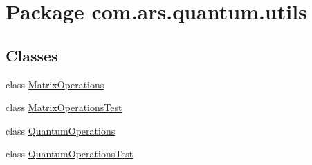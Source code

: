 \hypertarget{namespacecom_1_1ars_1_1quantum_1_1utils}{}\section{Package com.\+ars.\+quantum.\+utils}
\label{namespacecom_1_1ars_1_1quantum_1_1utils}
\subsection*{Classes}
\begin{DoxyCompactItemize}
\item 
class \hyperlink{classcom_1_1ars_1_1quantum_1_1utils_1_1_matrix_operations}{Matrix\+Operations}
\item 
class \hyperlink{classcom_1_1ars_1_1quantum_1_1utils_1_1_matrix_operations_test}{Matrix\+Operations\+Test}
\item 
class \hyperlink{classcom_1_1ars_1_1quantum_1_1utils_1_1_quantum_operations}{Quantum\+Operations}
\item 
class \hyperlink{classcom_1_1ars_1_1quantum_1_1utils_1_1_quantum_operations_test}{Quantum\+Operations\+Test}
\end{DoxyCompactItemize}
